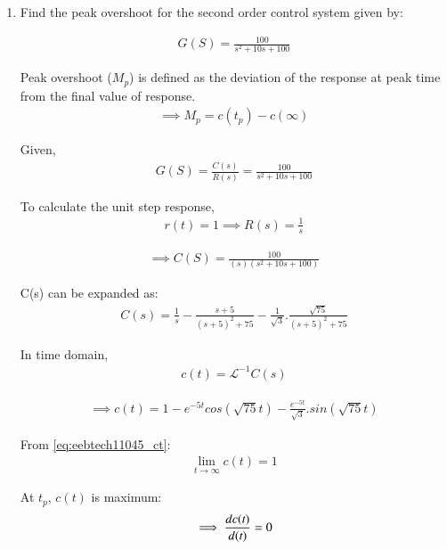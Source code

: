 \begin{enumerate}[label=\thesubsection.\arabic*.,ref=\thesubsection.\theenumi]

\item Find the peak overshoot for the second order control system given by:

\begin{align}
    G(S) = \frac{100}{s^2 + 10s +100}
\end{align}

\solution
Peak overshoot ($M_p$) is defined as the deviation of the response at peak time from the final value of response.
\begin{align}
    \implies M_p = c(t_p) - c(\infty)
    \label{eq:eebtech11045_Mp}
\end{align}

Given,
\begin{align}
    G(S) = \frac{C(s)}{R(s)} = \frac{100}{s^2 + 10s +100}
\end{align}

To calculate the unit step response,
\begin{align}
    r(t) = 1 \implies R(s) = \frac{1}{s}    
\end{align}

\begin{align}
    \implies C(S) = \frac{100}{(s)(s^2 + 10s +100)}
\end{align}

C(s) can be expanded as:
\begin{align}
    C(s) = \frac{1}{s} - \frac{s+5}{(s+5)^2 + 75} - \frac{1}{\sqrt{3}}.\frac{\sqrt{75}}{(s+5)^2 + 75}
\end{align}

In time domain, 
\begin{align}
    c(t) = \mathcal{L}^{-1}{C(s)}
\end{align}

\begin{align}
    \implies c(t) = 1 - e^{-5t}cos(\sqrt{75}t) - \frac{e^{-5t}}{\sqrt{3}}.sin(\sqrt{75}t)
    \label{eq:eebtech11045_ct}
\end{align}

From \eqref{eq:eebtech11045_ct}:
\begin{align}
    \lim_{t \to \infty} c(t) = 1
\end{align}

At $t_p$, $c(t)$ is maximum:
\begin{align}
    \implies \frac{dc(\emph{t})}{d(\emph{t})} = 0
\end{align}


\end{enumerate}

